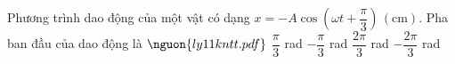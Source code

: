 \begin{ex}
Phương trình dao động của một vật có dạng $x=-A\cos\left(\omega t+\dfrac{\pi}{3}\right)\,(\mathrm{cm})$. Pha ban đầu của dao động là $\nguon{ly11 kntt.pdf}$
\choice
{$\dfrac{\pi}{3}$ rad}
{$-\dfrac{\pi}{3}$ rad}
{$\dfrac{2\pi}{3}$ rad}
{\True $-\dfrac{2\pi}{3}$ rad}
\end{ex}
